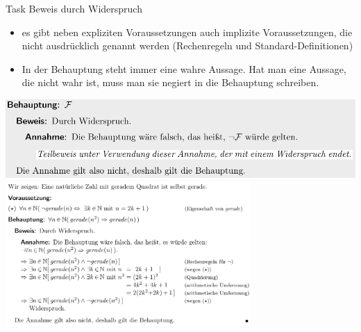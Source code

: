 \begin{frame}[allowframebreaks]{Task \thesection}{Beweis durch Widerspruch}
\begin{Sidenote}
    \begin{itemize}
      \item es gibt neben \alert{expliziten Voraussetzungen} auch \alert{implizite Voraussetzungen}, die nicht ausdrücklich genannt werden (Rechenregeln und Standard-Definitionen)
      \item In der \alert{Behauptung} steht immer eine \alert{wahre Aussage}. Hat man eine Aussage, die \alert{nicht wahr} ist, muss man sie \alert{negiert} in die Behauptung schreiben.
    \end{itemize}
  \end{Sidenote}
  \includegraphics[width=\textwidth, center]{./figures/beweis_durch_widerspruch.png}
  \includegraphics[width=0.7\textwidth, center]{./figures/beweis_durch_widerspruch_beispiel.png}
\end{frame}
